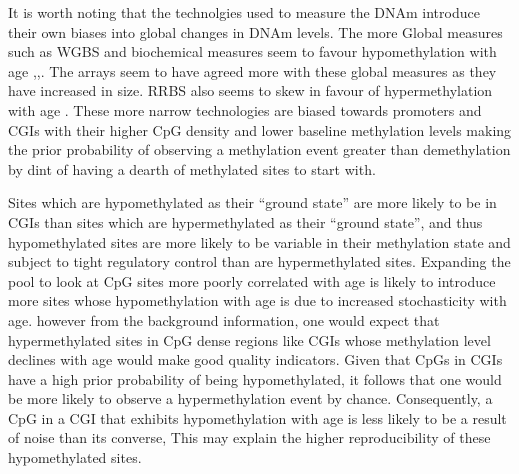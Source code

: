 \documentclass[]{book}
\begin{document}
It is worth noting that the technolgies used to measure the DNAm introduce their own biases into global changes in DNAm levels. The more Global measures such as WGBS and biochemical measures seem to favour hypomethylation with age \citep{Wilson1987},\citep{Fraga2005},\citep{Heyn2012}. The arrays seem to have agreed more with these global measures as they have increased in size. RRBS also seems to skew in favour of hypermethylation with age \citep{Cole2017}. These more narrow technologies are biased towards promoters and CGIs with their higher CpG density and lower baseline methylation levels making the prior probability of observing a methylation event greater than demethylation by dint of having a dearth of methylated sites to start with.

Sites which are hypomethylated as their ``ground state'' are more likely to be in CGIs than sites which are hypermethylated as their ``ground state'', and thus hypomethylated sites are more likely to be variable in their methylation state and subject to tight regulatory control than are hypermethylated sites. Expanding the pool to look at CpG sites more poorly correlated with age is likely to introduce more sites whose hypomethylation with age is due to increased stochasticity with age. however from the background information, one would expect that hypermethylated sites in CpG dense regions like CGIs whose methylation level declines with age would make good quality indicators. Given that CpGs in CGIs have a high prior probability of being hypomethylated, it follows that one would be more likely to observe a hypermethylation event by chance. Consequently, a CpG in a CGI that exhibits hypomethylation with age is less likely to be a result of noise than its converse, This may explain the higher reproducibility of these hypomethylated sites.
\end{document}
